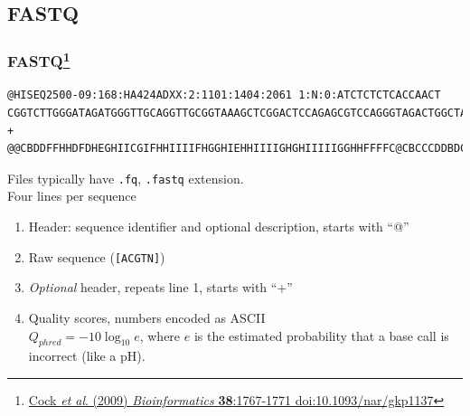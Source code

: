 \subsection{FASTQ}

\begin{frame}[fragile]
  \frametitle{FASTQ\footnote{\tiny{\href{http://dx.doi.org/10.1093/nar/gkp1137}{Cock \textit{et al}. (2009) \textit{Bioinformatics} \textbf{38}:1767-1771 doi:10.1093/nar/gkp1137}}}}
\begin{verbatim}
@HISEQ2500-09:168:HA424ADXX:2:1101:1404:2061 1:N:0:ATCTCTCTCACCAACT
CGGTCTTGGGATAGATGGGTTGCAGGTTGCGGTAAAGCTCGGACTCCAGAGCGTCCAGGGTAGACTGGCTAATCTTCTGCTCTTTATCGATCATTATTTC
+
@@CBDDFFHHDFDHEGHIICGIFHHIIIIFHGGHIEHHIIIIGHGHIIIIIGGHHFFFFC@CBCCCDDBDCDDDDDDDDCCDDDD3@ABDDDDDEEEDE@
\end{verbatim}
  Files typically have \texttt{.fq}, \texttt{.fastq} extension. \\
  Four lines per sequence
  \begin{enumerate}
    \item Header: sequence identifier and optional description, starts with ``@''
    \item Raw sequence (\texttt{[ACGTN]})
    \item \textit{Optional} header, repeats line 1, starts with ``+''
    \item Quality scores, numbers encoded as ASCII\\
             $Q_{phred} = -10 \log_{10}e$, where $e$ is the estimated probability that a base call is incorrect (like a pH).
  \end{enumerate}
\end{frame}

